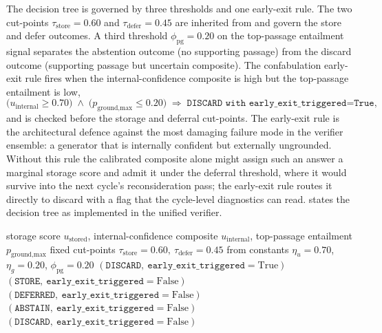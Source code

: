 The decision tree is governed by three thresholds and one early-exit rule. The two cut-points $\tau_{\text{store}} = 0.60$ and $\tau_{\text{defer}} = 0.45$ are inherited from  and govern the store and defer outcomes. A third threshold $\phi_{\text{pg}} = 0.20$ on the top-passage entailment signal separates the abstention outcome (no supporting passage) from the discard outcome (supporting passage but uncertain composite). The confabulation early-exit rule fires when the internal-confidence composite is high but the top-passage entailment is low,
\begin{equation}
\big(u_{\text{internal}} \ge 0.70\big) \;\wedge\; \big(p_{\text{ground,max}} \le 0.20\big)
\;\Rightarrow\; \texttt{DISCARD with early\_exit\_triggered=True},
\label{eq:early-exit-rule}
\end{equation}
and is checked before the storage and deferral cut-points. The early-exit rule is the architectural defence against the most damaging failure mode in the verifier ensemble: a generator that is internally confident but externally ungrounded. Without this rule the calibrated composite alone might assign such an answer a marginal storage score and admit it under the deferral threshold, where it would survive into the next cycle's reconsideration pass; the early-exit rule routes it directly to discard with a flag that the cycle-level diagnostics can read.  states the decision tree as implemented in the unified verifier.

\begin{algorithm}[!htbp]
\caption[Four-outcome storage decision (Stage~6).]{Four-outcome storage decision (Stage~6).}
\label{alg:decision}
\begin{algorithmic}[1]
\Require storage score $u_{\text{stored}}$, internal-confidence composite $u_{\text{internal}}$, top-passage entailment $p_{\text{ground,max}}$
\Require fixed cut-points $\tau_{\text{store}} = 0.60,\ \tau_{\text{defer}} = 0.45$ from 
\Require constants $\eta_{u} = 0.70$, $\eta_{g} = 0.20$, $\phi_{\text{pg}} = 0.20$
    \State \Return $(\texttt{DISCARD},\ \texttt{early\_exit\_triggered}=\text{True})$ 
\EndIf
{}
    \State \Return $(\texttt{STORE},\ \texttt{early\_exit\_triggered}=\text{False})$
\EndIf
{}
    \State \Return $(\texttt{DEFERRED},\ \texttt{early\_exit\_triggered}=\text{False})$
\EndIf
{}
    \State \Return $(\texttt{ABSTAIN},\ \texttt{early\_exit\_triggered}=\text{False})$
\EndIf
\State \Return $(\texttt{DISCARD},\ \texttt{early\_exit\_triggered}=\text{False})$
\end{algorithmic}
\end{algorithm}

